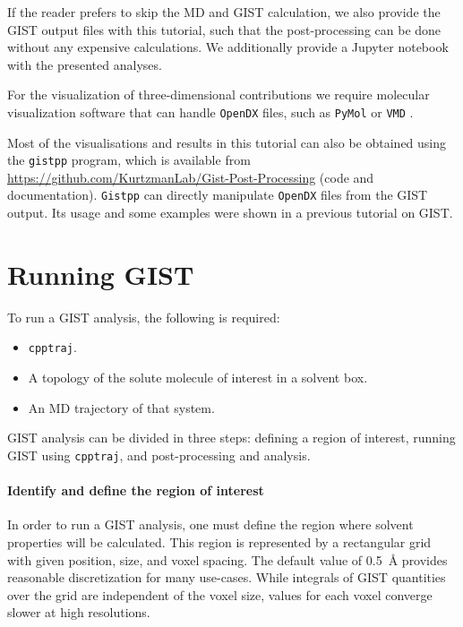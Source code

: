 \documentclass[9pt,tutorial]{livecoms}
\newcommand{\software}{\texttt}
\begin{document}
If the reader prefers to skip the MD and GIST calculation, we also provide the GIST output files with this tutorial, such that the post-processing can be done without any expensive calculations.
We additionally provide a Jupyter notebook \cite{Kluyver2016-jupyter,Granger2021-jupyter} with the presented analyses. 

For the visualization of three-dimensional contributions we require molecular visualization software that can handle \software{OpenDX} files, such as \software{PyMol} \cite{pymol} or \software{VMD} \cite{vmd}.

Most of the visualisations and results in this tutorial can also be obtained using the \software{gistpp} program, which is available from \url{https://github.com/KurtzmanLab/Gist-Post-Processing} (code and documentation). \software{Gistpp} can directly manipulate \software{OpenDX} files from the GIST output. 
Its usage and some examples were shown in a previous tutorial on GIST\cite{Ramsey2016}.

\section{Running GIST}
\label{sec:running_GIST}
To run a GIST analysis, the following is required:
\begin{itemize}
	\item \software{cpptraj}.
	\item A topology of the solute molecule of interest in a solvent box.
	\item An MD trajectory of that system.
\end{itemize}
GIST analysis can be divided in three steps: defining a region of interest, running GIST using \software{cpptraj}, and post-processing and analysis.
\cite{Ramsey2016}

\paragraph{Identify and define the region of interest}
In order to run a GIST analysis, one must define the region where solvent properties will be calculated.
This region is represented by a rectangular grid with given position, size, and voxel spacing.
The default value of \SI{0.5}{\angstrom} provides reasonable discretization for many use-cases.
While integrals of GIST quantities over the grid are independent of the voxel size, values for each voxel converge slower at high resolutions.
\end{document}
